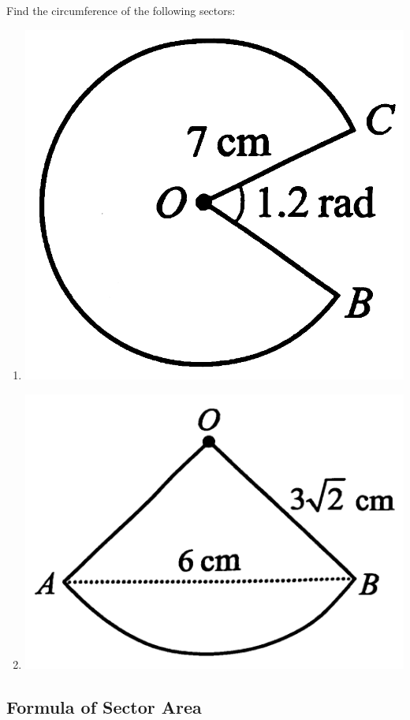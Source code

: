 \documentclass{report}
\begin{document}
Find the circumference of the following sectors:
\begin{multicols}{2}
    \begin{enumerate}[label=(\alph*)]
        \item \includegraphics[scale=0.12,valign=t]{assets/8-9.png}
        \item \includegraphics[scale=0.12,valign=t]{assets/8-10.png}
    \end{enumerate}
\end{multicols}

\subsection*{Formula of Sector Area}
\end{document}
